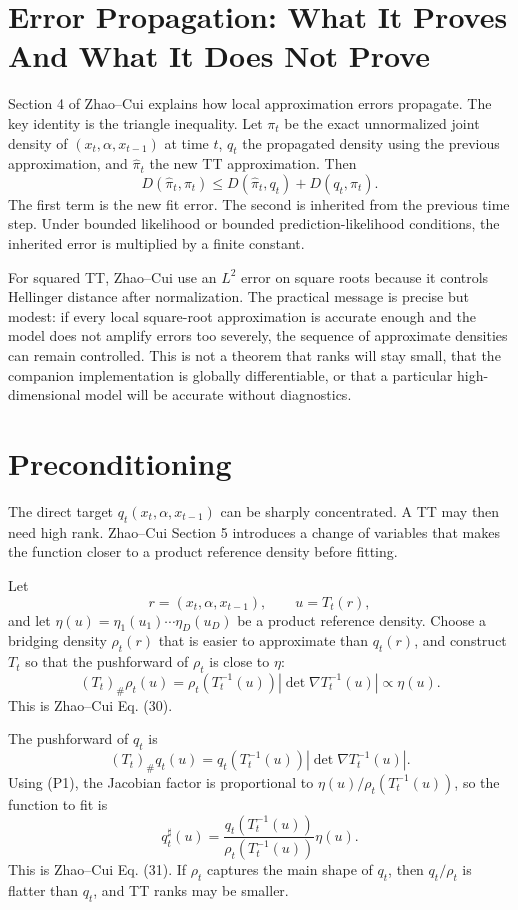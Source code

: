 \documentclass[11pt]{article}
\begin{document}
\section{Error Propagation: What It Proves And What It Does Not Prove}

Section 4 of Zhao--Cui explains how local approximation errors propagate.  The
key identity is the triangle inequality.  Let \(\pi_t\) be the exact
unnormalized joint density of \((x_t,\alpha,x_{t-1})\) at time \(t\), \(q_t\)
the propagated density using the previous approximation, and
\(\widehat\pi_t\) the new TT approximation.  Then
\[
    D(\widehat\pi_t,\pi_t)
    \le
    D(\widehat\pi_t,q_t)+D(q_t,\pi_t).
    \tag{E1}
\]
The first term is the new fit error.  The second is inherited from the previous
time step.  Under bounded likelihood or bounded prediction-likelihood
conditions, the inherited error is multiplied by a finite constant.

For squared TT, Zhao--Cui use an \(L^2\) error on square roots because it
controls Hellinger distance after normalization.  The practical message is
precise but modest: if every local square-root approximation is accurate enough
and the model does not amplify errors too severely, the sequence of approximate
densities can remain controlled.  This is not a theorem that ranks will stay
small, that the companion implementation is globally differentiable, or that a
particular high-dimensional model will be accurate without diagnostics.

\section{Preconditioning}

The direct target \(q_t(x_t,\alpha,x_{t-1})\) can be sharply concentrated.  A TT
may then need high rank.  Zhao--Cui Section 5 introduces a change of variables
that makes the function closer to a product reference density before fitting.

Let
\[
    r=(x_t,\alpha,x_{t-1}),\qquad u=T_t(r),
\]
and let \(\eta(u)=\eta_1(u_1)\cdots\eta_D(u_D)\) be a product reference density.
Choose a bridging density \(\rho_t(r)\) that is easier to approximate than
\(q_t(r)\), and construct \(T_t\) so that the pushforward of \(\rho_t\) is close
to \(\eta\):
\[
    (T_t)_\#\rho_t(u)
    =
    \rho_t(T_t^{-1}(u))
    \left|\det\nabla T_t^{-1}(u)\right|
    \propto
    \eta(u).
    \tag{P1}
\]
This is Zhao--Cui Eq. (30).

The pushforward of \(q_t\) is
\[
    (T_t)_\#q_t(u)
    =
    q_t(T_t^{-1}(u))
    \left|\det\nabla T_t^{-1}(u)\right|.
\]
Using (P1), the Jacobian factor is proportional to
\(\eta(u)/\rho_t(T_t^{-1}(u))\), so the function to fit is
\[
    q^\sharp_t(u)
    =
    \frac{q_t(T_t^{-1}(u))}
    {\rho_t(T_t^{-1}(u))}
    \eta(u).
    \tag{P2}
\]
This is Zhao--Cui Eq. (31).  If \(\rho_t\) captures the main shape of \(q_t\),
then \(q_t/\rho_t\) is flatter than \(q_t\), and TT ranks may be smaller.
\end{document}
